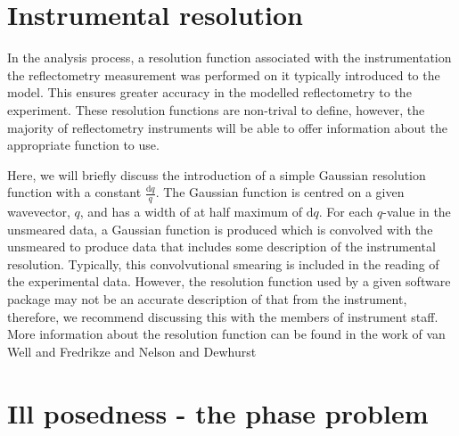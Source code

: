 \documentclass[
 reprint,
 superscriptaddress,
 amsmath,amssymb,
 aps,
]{revtex4-1}
\begin{document}
\section{Instrumental resolution}
In the analysis process, a resolution function associated with the instrumentation the reflectometry measurement was performed on it typically introduced to the model.
This ensures greater accuracy in the modelled reflectometry to the experiment.
These resolution functions are non-trival to define, however, the majority of reflectometry instruments will be able to offer information about the appropriate function to use.

Here, we will briefly discuss the introduction of a simple Gaussian resolution function with a constant $\frac{\text{d}q}{q}$.
The Gaussian function is centred on a given wavevector, $q$, and has a width of at half maximum of $\text{d}q$.
For each $q$-value in the unsmeared data, a Gaussian function is produced which is convolved with the unsmeared to produce data that includes some description of the instrumental resolution.
Typically, this convolvutional smearing is included in the reading of the experimental data.
However, the resolution function used by a given software package may not be an accurate description of that from the instrument, therefore, we recommend discussing this with the members of instrument staff.
More information about the resolution function can be found in the work of van Well and Fredrikze \cite{vanwell_resolution_2005} and Nelson and Dewhurst \cite{nelson_towards_2013,nelson_towards_2014}

\section{Ill posedness - the phase problem}
\end{document}
